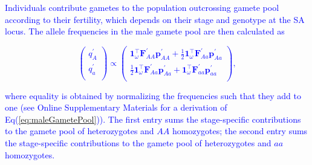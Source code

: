 \documentclass[11pt]{article}
\def\mbf#1{\mathbf{#1}}
\begin{document}
\textcolor{blue}{Individuals contribute  gametes to the population outcrossing gamete pool according to their fertility, which depends on their stage and genotype at the SA locus. The allele frequencies in the male gamete pool are then calculated as 
\begin{linenomath*}
\begin{equation} \label{eq:maleGametePool}
	\left(
		\begin{array}{c}
			q^{\prime}_{A} \\
			q^{\prime}_{a} \\
		\end{array} \right) \propto 
				\left(
		\begin{array}{c}
			\mbf{1}^{\intercal}_{\omega}\mbf{F}^{\prime}_{AA}\mbf{p}^{\prime}_{AA}+ \frac{1}{2} \mbf{1}^{\intercal}_{\omega}  \mbf{F}^{\prime}_{Aa} \mbf{p}^{\prime}_{Aa}  \\
		\frac{1}{2} \mbf{1}^{\intercal}_{\omega}  \mbf{F}^{\prime}_{Aa} \mbf{p}^{\prime}_{Aa} + \mbf{1}^{\intercal}_{\omega}\mbf{F}^{\prime}_{aa}\mbf{p}^{\prime}_{aa}\\
		\end{array} \right),
\end{equation}
\end{linenomath*}
where equality is obtained by normalizing the frequencies such that they add to one (see Online Supplementary Materials for a derivation of Eq(\ref{eq:maleGametePool})). The first entry sums the  stage-specific contributions to the gamete pool of heterozygotes and $AA$ homozygotes; the second entry sums the stage-specific contributions to the gamete pool of heterozygotes and $aa$ homozygotes. }
\end{document}
